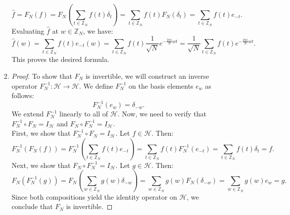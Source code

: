 \documentclass{article}
\def\zz{{\mathbb Z}}
\begin{document}
\begin{enumerate}[(a)]
\begin{enumerate}[1.]
\begin{enumerate}[1.]
\begin{equation*}
                \hat{f} = F_N(f) = F_N\left( \sum_{t \in \zz_N} f(t) \delta_t \right) = \sum_{t \in \zz_N} f(t) F_N(\delta_t) = \sum_{t \in \zz_N} f(t) e_{-t}.
            \end{equation*}
            Evaluating $\hat{f}$ at $w \in \zz_N$, we have:
            \begin{equation*}
                \hat{f}(w) = \sum_{t \in \zz_N} f(t) e_{-t}(w) = \sum_{t \in \zz_N} f(t) \frac{1}{\sqrt{N}} e^{-\frac{2 \pi i}{N} w t} = \frac{1}{\sqrt{N}} \sum_{t \in \zz_N} f(t) e^{-\frac{2 \pi i}{N} w t}.
            \end{equation*}
            This proves the desired formula.
            \item \begin{proof}
                To show that $F_N$ is invertible, we will construct an inverse operator $F_N^{-1}: \mathscr{H} \to \mathscr{H}$. We define $F_N^{-1}$ on the basis elements $e_w$ as follows:
                \begin{equation*}
                    F_N^{-1}(e_w) = \delta_{-w}.
                \end{equation*}
                We extend $F_N^{-1}$ linearly to all of $\mathscr{H}$. Now, we need to verify that $F_N^{-1} \circ F_N = I_{\mathscr{H}}$ and $F_N \circ F_N^{-1} = I_{\mathscr{H}}$. \\
                First, we show that $F_N^{-1} \circ F_N = I_{\mathscr{H}}$. Let $f \in \mathscr{H}$. Then:
                \begin{equation*}
                    F_N^{-1}(F_N(f)) = F_N^{-1}\left( \sum_{t \in \zz_N} f(t) e_{-t} \right) = \sum_{t \in \zz_N} f(t) F_N^{-1}(e_{-t}) = \sum_{t \in \zz_N} f(t) \delta_t = f.
                \end{equation*}
                Next, we show that $F_N \circ F_N^{-1} = I_{\mathscr{H}}$. Let $g \in \mathscr{H}$. Then:
                \begin{equation*}
                    F_N(F_N^{-1}(g)) = F_N\left( \sum_{w \in \zz_N} g(w) \delta_{-w} \right) = \sum_{w \in \zz_N} g(w) F_N(\delta_{-w}) = \sum_{w \in \zz_N} g(w) e_w = g.
                \end{equation*}
                Since both compositions yield the identity operator on $\mathscr{H}$, we conclude that $F_N$ is invertible.
            \end{proof}
        \end{enumerate}
    \end{enumerate}
\end{enumerate}
\end{document}

